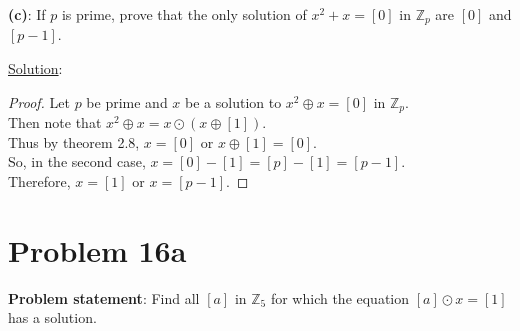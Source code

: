 \documentclass{article} %
\begin{document}
\textbf{(c)}: If $p$ is prime, prove that the only solution of $x^2 + x = [0]$ in $\mathbb{Z}_p$ are $[0]$ and $[p-1]$.
\\
\begin{addmargin}[1em]{0em}
\underline{Solution}: 
\begin{addmargin}[1em]{0em}
\begin{proof}
Let $p$ be prime and $x$ be a solution to $x^2 \oplus x = [0]$ in $\mathbb{Z}_p$.
\\Then note that $x^2 \oplus x = x \odot (x \oplus [1])$.
\\Thus by theorem 2.8, $x = [0]$ or $x \oplus [1] = [0]$.
\\So, in the second case, $x = [0] - [1] = [p] - [1] = [p-1]$.
\\Therefore, $x = [1]$ or $x = [p-1]$.
\end{proof}
\end{addmargin}
\end{addmargin}

\newpage

\section*{Problem 16a}


\textbf{Problem statement}: Find all $[a]$ in $\mathbb{Z}_5$ for which the equation $[a] \odot x = [1]$ has a solution.
\\
\end{document}
